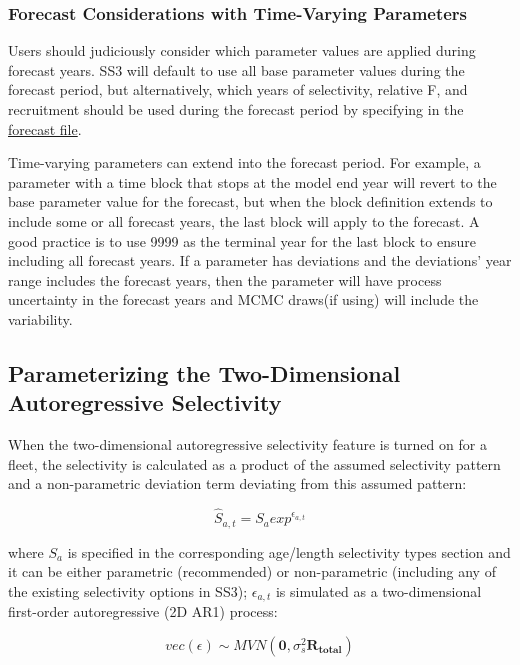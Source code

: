\subsubsection{Forecast Considerations with Time-Varying Parameters}

Users should judiciously consider which parameter values are applied during forecast years. SS3 will default to use all base parameter values during the forecast period, but alternatively, which years of selectivity, relative F, and recruitment should be used during the forecast period by specifying in the \hyperlink{fore-specify}{forecast file}.

Time-varying parameters can extend into the forecast period. For example, a parameter with a time block that stops at the model end year will revert to the base parameter value for the forecast, but when the block definition extends to include some or all forecast years, the last block will apply to the forecast. A good practice is to use 9999 as the terminal year for the last block to ensure including all forecast years. If a parameter has deviations and the deviations' year range includes the forecast years, then the parameter will have process uncertainty in the forecast years and MCMC draws(if using) will include the variability.


\hypertarget{2DAR}{}
\subsection{Parameterizing the Two-Dimensional Autoregressive Selectivity}
When the two-dimensional autoregressive selectivity feature is turned on for a fleet, the selectivity is calculated as a product of the assumed selectivity pattern and a non-parametric deviation term deviating from this assumed pattern:

\begin{equation}
\hat{S}_{a,t} = S_aexp^{\epsilon_{a,t}}
\end{equation}

where $S_a$ is specified in the corresponding age/length selectivity types section and it can be either parametric (recommended) or non-parametric (including any of the existing selectivity options in SS3); $\epsilon_{a,t}$ is simulated as a two-dimensional first-order autoregressive (2D AR1) process:

\begin{equation}
vec(\epsilon) \sim MVN(\mathbf{0},\sigma_s^2\mathbf{R_{total}})
\end{equation}

